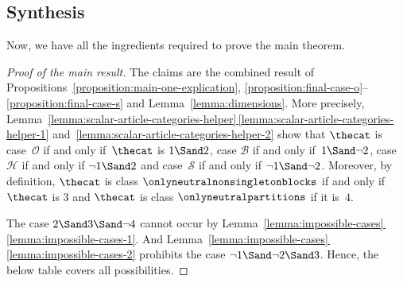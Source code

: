 \documentclass[pdftex]{sigma}
\numberwithin{equation}{section}
\begin{document}
\subsection{Synthesis}
Now, we have all the ingredients required to prove the main theorem.
\begin{proof}[Proof of the main result]
  \newcommand{\themat}{v}
  \newcommand{\indi}{i}
  \newcommand{\indj}{j}
  \newcommand{\thecoc}{\eta}
  \newcommand{\thecocx}[1]{\eta(#1)}
  \newcommand{\thebetti}{\beta_1(\widehat{G})}
  \newcommand{\thesum}{\lambda}
  \newcommand{\neutralblocks}{3}
  \newcommand{\neutralpartitions}{4}
  \newcommand{\smallblocks}{1}
  \newcommand{\largeblocks}{2}
  The claims are the combined result of Pro\-po\-si\-tions~\ref{proposition:main-one-explication}, \ref{proposition:final-case-o}--\ref{proposition:final-case-s} and Lem\-ma~\ref{lemma:dimensions}. More precisely, Lem\-ma~\hyperref[lemma:scalar-article-categories-helper-1]{\ref*{lemma:scalar-article-categories-helper}\,\ref*{lemma:scalar-article-categories-helper-1}} and~\hyperref[lemma:scalar-article-categories-helper-2]{\ref*{lemma:scalar-article-categories-helper-2}} show that $\thecat$ is case~$\mathcal{O}$ if and only if~$\thecat$ is $\smallblocks\Sand\largeblocks$, case $\mathcal{B}$ if and only if~$\smallblocks\Sand\neg \largeblocks$, case~$\mathcal{H}$ if and only if $\neg \smallblocks\Sand\largeblocks$ and case~$\mathcal{S}$ if and only if $\neg \smallblocks\Sand\neg\largeblocks$. Moreover, by definition, $\thecat$ is class $\onlyneutralnonsingletonblocks$ if and only if $\thecat$ is $\neutralblocks$  and $\thecat$ is class $\onlyneutralpartitions$ if it is~$\neutralpartitions$.

  The case  $\largeblocks\Sand  \neutralblocks\Sand \neg\neutralpartitions$ cannot occur by Lem\-ma~\hyperref[lemma:impossible-cases-1]{\ref*{lemma:impossible-cases}\,\ref*{lemma:impossible-cases-1}}. And Lem\-ma~\hyperref[lemma:impossible-cases-2]{\ref*{lemma:impossible-cases}\,\ref*{lemma:impossible-cases-2}} prohibits the case  $\neg\smallblocks\Sand \neg\largeblocks\Sand \neutralblocks$. Hence, the below table covers all possibilities.


\end{proof}
\end{document}
